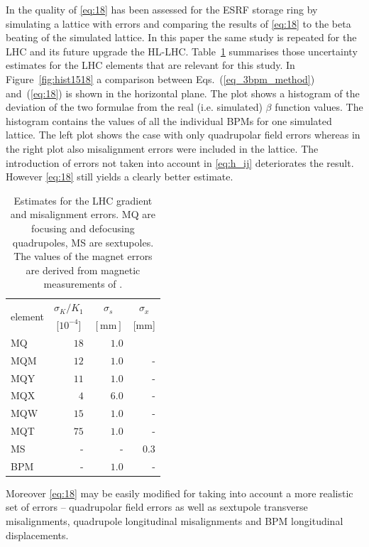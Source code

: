 In \cite{Franchi2016} the quality of \eqref{eq:18} has been assessed for the ESRF storage ring by
simulating a lattice with errors and comparing the results of \eqref{eq:18} to the beta beating of
the simulated lattice. In this paper the same study is repeated for the LHC and its future upgrade the HL-LHC.
Table~\ref{tab:unc_estimates} summarises those uncertainty estimates for the LHC elements that are
relevant for this study. 
In Figure~\ref{fig:hist1518} a comparison between Eqs.~(\ref{eq_3bpm_method}) and~(\ref{eq:18}) is shown
in the horizontal plane. The plot shows a histogram of the deviation of the two formulae
from the real (i.e. simulated) $ \beta $ function values. The histogram contains the values of all the
individual BPMs for one simulated lattice. The left plot shows the case with only quadrupolar field
errors whereas in the right plot also misalignment errors were included in the lattice. The introduction
of errors not taken into account in \eqref{eq:h_ij} deteriorates the result. However \eqref{eq:18}
still yields a clearly better estimate.


\begin{table}
	\centering
	\begin{tabular}{lrrr}
		\multirow{ 2}{*}{element} & \multicolumn{1}{c}{ $ \sigma_K/K_1 $ }&\multicolumn{1}{c}{ $ \sigma_s $ }&\multicolumn{1}{c}{ $ \sigma_x $}\\
		&\multicolumn{1}{c}{  [$ 10^{-4} $]} &\multicolumn{1}{c}{  $ [\text{mm}] $} &\multicolumn{1}{c}{  [mm]} \rule[-3mm]{0mm}{0mm} \\ 
		\hline
		MQ & $18  $ & $ 1.0   $ &\rule[5mm]{0mm}{0mm}\\
		MQM & $ 12 $ & $ 1.0   $ & -\\
		MQY & $ 11 $ & $ 1.0  $ & -\\
		MQX &  $4   $ & $ 6.0   $  & -\\
		MQW & $ 15  $ & $ 1.0   $  & -\\
		MQT & $ 75  $ & $ 1.0   $  & -\\
		MS & -& - & $ 0.3   $ \\
		BPM & -& $ 1.0   $ & - 
	\end{tabular}
    \caption{Estimates for the LHC gradient and misalignment errors. MQ are focusing and defocusing
    quadrupoles, MS are sextupoles.
    The values of the magnet errors are derived from magnetic measurements of \cite{wise1, wise2}.
    }
	\label{tab:unc_estimates}
\end{table}

Moreover \eqref{eq:18} may be easily modified for taking into account a more realistic set of errors -- quadrupolar field errors as well as sextupole transverse misalignments, quadrupole longitudinal misalignments and BPM longitudinal displacements. 


